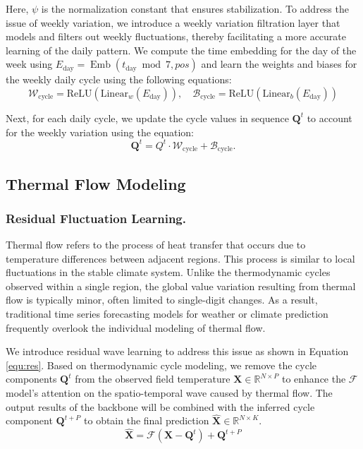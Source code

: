Here, \( \psi \) is the normalization constant that ensures stabilization.
To address the issue of weekly variation, we introduce a weekly variation filtration layer that models and filters out weekly fluctuations, thereby facilitating a more accurate learning of the daily pattern. We compute the time embedding for the day of the week using \( E_{\text{day}} = \operatorname{Emb}(t_{\text{day}} \bmod 7, pos) \) and learn the weights and biases for the weekly daily cycle using the following equations:
\begin{equation}
\mathcal{W}_{\text{cycle}} = \text{ReLU}\left(\mathrm{Linear}_w(E_{\text{day}})\right), \quad \mathcal{B}_{\text{cycle}} = \text{ReLU}\left(\mathrm{Linear}_b(E_{\text{day}})\right)
\end{equation}

Next, for each daily cycle, we update the cycle values in sequence $\textbf{Q}^{t}$ to account for the weekly variation using the equation:
\begin{equation}
\textbf{Q}^{t} = Q^{t} \cdot \mathcal{W}_{\text{cycle}} + \mathcal{B}_{\text{cycle}}.
\end{equation}

\subsection{Thermal Flow Modeling}

\subsubsection{Residual Fluctuation Learning.}
Thermal flow refers to the process of heat transfer that occurs due to temperature differences between adjacent regions. This process is similar to local fluctuations in the stable climate system. Unlike the thermodynamic cycles observed within a single region, the global value variation resulting from thermal flow is typically minor, often limited to single-digit changes. As a result, traditional time series forecasting models for weather or climate prediction frequently overlook the individual modeling of thermal flow.

We introduce residual wave learning to address this issue as shown in Equation \ref{equ:res}. Based on thermodynamic cycle modeling, we remove the cycle components $\textbf{Q}^{t}$ from the observed field temperature $\textbf{X} \in \mathbb{R}^{N \times P}$ to enhance the $\mathcal{F}$ model's attention on the spatio-temporal wave caused by thermal flow. The output results of the backbone will be combined with the inferred cycle component $\textbf{Q}^{t+P}$ to obtain the final prediction $\hat{\textbf{X}} \in \mathbb{R}^{N \times K}$. 
\begin{equation}
\label{equ:res}
    \hat{\textbf{X}} = \mathcal{F}(\textbf{X} - \textbf{Q}^{t}) + \textbf{Q}^{t+P}
\end{equation}

